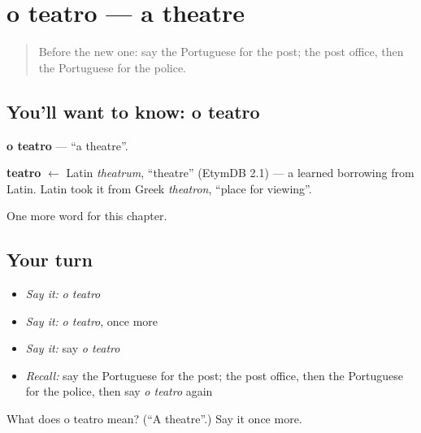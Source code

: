 \section[o teatro]{o teatro — a theatre}

\label{lesson:PT-C76-teatro}



\begin{quote}
Before the new one: say the Portuguese for the post; the post office, then the Portuguese for the police.
\end{quote}

\subsection*{You'll want to know: o teatro}
\textbf{o teatro} — \textquotedblleft{}a theatre\textquotedblright{}.

\begin{cousinweb}
\textbf{teatro} $\leftarrow$ Latin \emph{theatrum}, \textquotedblleft{}theatre\textquotedblright{} (EtymDB 2.1) — a learned borrowing from Latin. Latin took it from Greek \emph{theatron}, \textquotedblleft{}place for viewing\textquotedblright{}.
\end{cousinweb}

\begin{grammarlens}[title={What you've built}]
One more word for this chapter.
\end{grammarlens}

\subsection*{Your turn}
\begin{itemize}
\raggedright
  \item \emph{Say it:} \emph{o teatro}
  \item \emph{Say it:} \emph{o teatro}, once more
  \item \emph{Say it:} say \emph{o teatro}
  \item \emph{Recall:} say the Portuguese for the post; the post office, then the Portuguese for the police, then say \emph{o teatro} again
\end{itemize}

\begin{tcolorbox}[breakable,colback=teal!4,colframe=teal!35!black,title={Before you move on}]
What does o teatro mean? (\textquotedblleft{}A theatre\textquotedblright{}.) Say it once more.
\end{tcolorbox}
